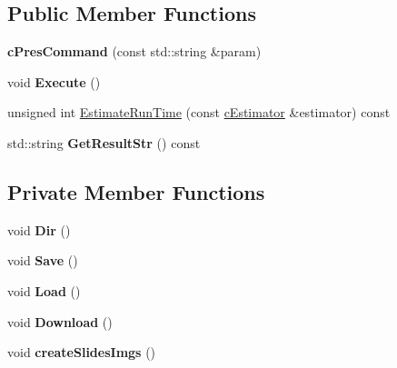 \subsection*{Public Member Functions}
\begin{DoxyCompactItemize}
\item 
\hypertarget{classengine_1_1cPresCommand_a81a6521956d3d2d61048bb907ea63b94}{{\bfseries c\-Pres\-Command} (const std\-::string \&param)}\label{classengine_1_1cPresCommand_a81a6521956d3d2d61048bb907ea63b94}

\item 
\hypertarget{classengine_1_1cPresCommand_a875b5daa49972be454095e0ea499569f}{void {\bfseries Execute} ()}\label{classengine_1_1cPresCommand_a875b5daa49972be454095e0ea499569f}

\item 
unsigned int \hyperlink{classengine_1_1cPresCommand_a4c0ce6703473a24a5b2b71cd6760a4b3}{Estimate\-Run\-Time} (const \hyperlink{classengine_1_1cEstimator}{c\-Estimator} \&estimator) const 
\item 
\hypertarget{classengine_1_1cPresCommand_a9bc204e529d366339d703bb5a384753c}{std\-::string {\bfseries Get\-Result\-Str} () const }\label{classengine_1_1cPresCommand_a9bc204e529d366339d703bb5a384753c}

\end{DoxyCompactItemize}
\subsection*{Private Member Functions}
\begin{DoxyCompactItemize}
\item 
\hypertarget{classengine_1_1cPresCommand_a2691f91a41ab1899aaeccdb62774dedd}{void {\bfseries Dir} ()}\label{classengine_1_1cPresCommand_a2691f91a41ab1899aaeccdb62774dedd}

\item 
\hypertarget{classengine_1_1cPresCommand_a5eea1c700878016231ee3ba293108061}{void {\bfseries Save} ()}\label{classengine_1_1cPresCommand_a5eea1c700878016231ee3ba293108061}

\item 
\hypertarget{classengine_1_1cPresCommand_a720eceeb1e5df8862aca3c0ac96f68f7}{void {\bfseries Load} ()}\label{classengine_1_1cPresCommand_a720eceeb1e5df8862aca3c0ac96f68f7}

\item 
\hypertarget{classengine_1_1cPresCommand_a3e4945fdcba13b6902f3b63a68bf369e}{void {\bfseries Download} ()}\label{classengine_1_1cPresCommand_a3e4945fdcba13b6902f3b63a68bf369e}

\item 
\hypertarget{classengine_1_1cPresCommand_a40d13bab28e7ec4914cc24db92af9ea4}{void {\bfseries create\-Slides\-Imgs} ()}\label{classengine_1_1cPresCommand_a40d13bab28e7ec4914cc24db92af9ea4}

\end{DoxyCompactItemize}
